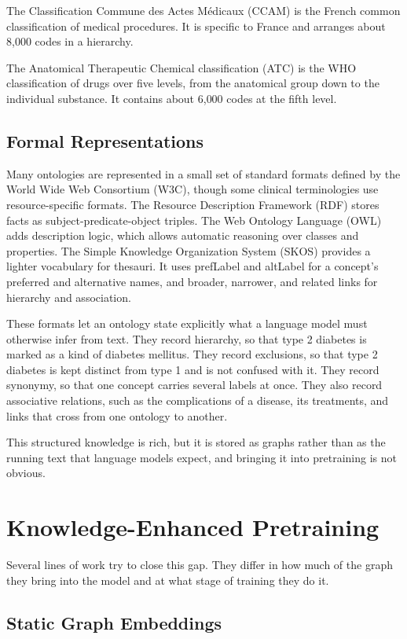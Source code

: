The Classification Commune des Actes Médicaux (CCAM) is the French common classification of
medical procedures. It is specific to France and arranges about 8{,}000 codes in a hierarchy.

The Anatomical Therapeutic Chemical classification (ATC) is the WHO classification of drugs
over five levels, from the anatomical group down to the individual substance. It contains
about 6{,}000 codes at the fifth level.

\subsection{Formal Representations}

Many ontologies are represented in a small set of standard formats defined by the World Wide
Web Consortium (W3C), though some clinical terminologies use resource-specific formats. The Resource Description Framework (RDF) stores facts as
subject-predicate-object triples. The Web Ontology Language (OWL) adds description logic,
which allows automatic reasoning over classes and properties. The Simple Knowledge
Organization System (SKOS) provides a lighter vocabulary for thesauri. It uses prefLabel and
altLabel for a concept's preferred and alternative names, and broader, narrower, and related
links for hierarchy and association.

These formats let an ontology state explicitly what a language model must otherwise infer
from text. They record hierarchy, so that type 2 diabetes is marked as a kind of diabetes
mellitus. They record exclusions, so that type 2 diabetes is kept distinct from type 1 and is
not confused with it. They record synonymy, so that one concept carries several labels at
once. They also record associative relations, such as the complications of a disease, its
treatments, and links that cross from one ontology to another.

This structured knowledge is rich, but it is stored as graphs rather than as the running text
that language models expect, and bringing it into pretraining is not obvious.
\section{Knowledge-Enhanced Pretraining}
\label{sec:corpus-knowledge}

Several lines of work try to close this gap. They differ in how much of the graph they bring
into the model and at what stage of training they do it.

\subsection{Static Graph Embeddings}

